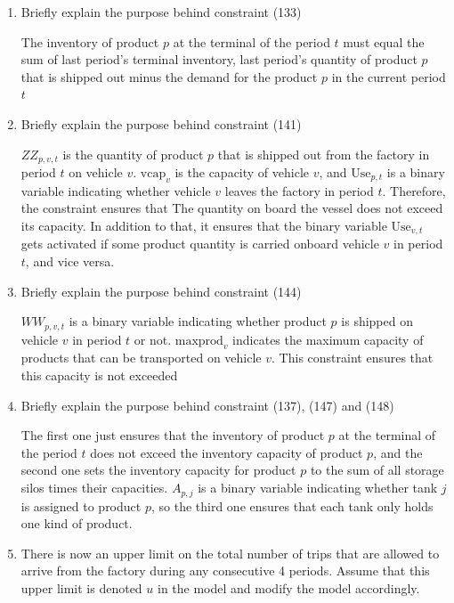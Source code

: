 \documentclass[10pt]{article}
\begin{document}
\begin{enumerate}
    \item Briefly explain the purpose behind constraint (133)
    
    The inventory of product $p $ at the terminal of the period $t $ must equal the sum of last period's terminal inventory, last period's quantity of product $p $ that is shipped out minus the demand for the product $p $ in the current period $t $
    \item Briefly explain the purpose behind constraint (141)

    $ZZ_{p, v, t} $ is the quantity of product $p $ that is shipped out from the factory in period $t $ on vehicle $v $. $\text{vcap}_v $ is the capacity of vehicle $v $, and $\text{Use}_{p, t} $ is a binary variable indicating whether vehicle $v $ leaves the factory in period $t $. Therefore, the constraint ensures that The quantity on board the vessel does not exceed its capacity. In addition to that, it ensures that the binary variable $\text{Use}_{v, t} $ gets activated if some product quantity is carried onboard vehicle $v $ in period $ t $, and vice versa. 
    \item Briefly explain the purpose behind constraint (144)

    $WW_{p, v, t} $ is a binary variable indicating whether product $p $ is shipped on vehicle $v $ in period $t $ or not. $\text{maxprod}_v $ indicates the maximum capacity of products that can be transported on vehicle $v $. This constraint ensures that this capacity is not exceeded
    \item Briefly explain the purpose behind constraint (137), (147) and (148)

    The first one just ensures that the inventory of product $p $ at the terminal of the period $t $ does not exceed the inventory capacity of product $p $, and the second one sets the inventory capacity for product $p $ to the sum of all storage silos times their capacities. $A_{p, j} $ is a binary variable indicating whether tank $j $ is assigned to product $p $, so the third one ensures that each tank only holds one kind of product.
    \item There is now an upper limit on the total number of trips that are allowed to arrive from the factory during any consecutive 4 periods. Assume that this upper limit is denoted $u $ in the model and modify the model accordingly. 


\end{enumerate}
\end{document}
